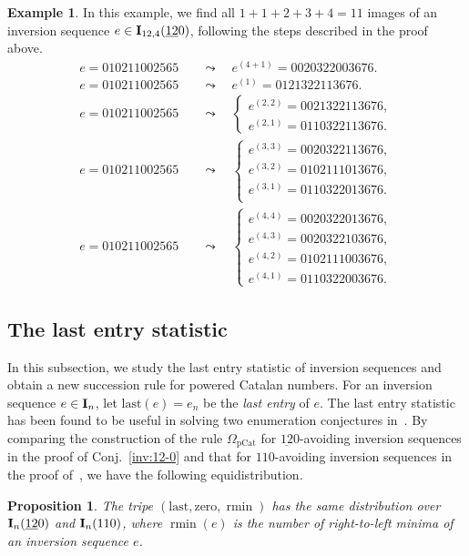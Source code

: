 \documentclass[12pt,A4]{amsart}
\numberwithin{equation}{section}
\theoremstyle{plain}
\newtheorem{proposition}[theorem]{Proposition}
\theoremstyle{definition}
\newtheorem{example}[theorem]{Example}
\def\last{\mathrm{last}}
\def\zero{\mathrm{zero}}
\def\I{\operatorname{{\bf I}}}
\def\rmin{\operatorname{rmin}}
\begin{document}
\begin{example}\label{eg-algorithm}
In this example, we find all $1+1+2+3+4=11$ images of an inversion sequence $e\in\I_{12,4}(\underline{12}0)$, following the steps described in the proof above. 
\begin{align*}
e=010211002565\quad &\leadsto \quad e^{(4+1)}=0020322003676. \\
e=010211002565\quad &\leadsto \quad e^{(1)}=0121322113676. \\
e=010211002565\quad &\leadsto \quad \begin{cases}e^{(2,2)}=0021322113676, \\ e^{(2,1)}=0110322113676.\end{cases}\\
e=010211002565\quad &\leadsto \quad \begin{cases}e^{(3,3)}=0020322113676, \\ e^{(3,2)}=0102111013676, \\ e^{(3,1)}=0110322013676. \\ \end{cases}\\
e=010211002565\quad &\leadsto \quad \begin{cases}e^{(4,4)}=0020322013676, \\ e^{(4,3)}=0020322103676, \\ e^{(4,2)}=0102111003676, \\ e^{(4,1)}=0110322003676. \end{cases}
\end{align*}
\end{example}



\subsection{The last entry statistic} In this subsection, we study the last entry statistic of inversion sequences and obtain a new succession rule for powered Catalan numbers. For an inversion sequence $e\in\I_n$, let $\last(e)=e_n$ be the {\em last entry} of $e$. The last entry statistic has been found to be useful in solving  two enumeration conjectures in~\cite{kl2}. By comparing the construction of the rule $\Omega_{\mathrm{pCat}}$ for $\underline{12}0$-avoiding inversion sequences in the proof of Conj.~\ref{inv:12-0} and that for $110$-avoiding inversion sequences in the proof of~\cite[Prop.~19]{bbgr}, we have the following equidistribution. 
\begin{proposition}
The tripe $(\last,\zero,\rmin)$ has the same distribution over $\I_n(\underline{12}0)$ and $\I_n(110)$, where $\rmin(e)$ is the number of right-to-left minima of an inversion sequence $e$. 
\end{proposition}
\end{document}
